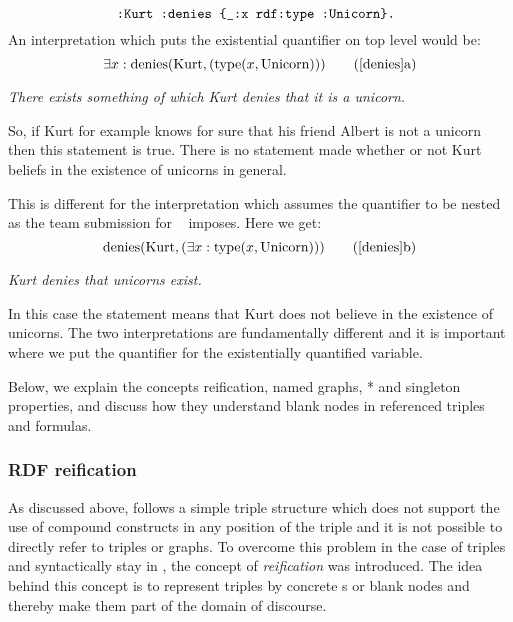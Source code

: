 % 
\begin{equation}\label{denies}
\verb!:Kurt :denies {_:x rdf:type :Unicorn}. !
\end{equation}
An interpretation which puts the existential quantifier on top level would be:
\[
\exists x : \text{denies}(\text{Kurt}, (\text{type}(x, \text{Unicorn})))\tag{\ref{denies}a} \label{dtop}
\]
\begin{center}\textit{
There exists something of which Kurt denies that it is a unicorn.
}
\end{center}
So, if Kurt for example knows for sure that his friend Albert is not a unicorn then this statement is true. There is no statement made whether or not Kurt beliefs 
in the existence of unicorns in general. 

This is different for the interpretation which assumes the quantifier to be nested as the \wwwc team submission for \nthree~\cite{Notation3} imposes. Here we get:
\[
 \text{denies}(\text{Kurt}, (\exists x : \text{type}(x, \text{Unicorn})))\tag{\ref{denies}b} \label{dnest}
\]
\begin{center}\textit{
Kurt denies that unicorns exist.
}
\end{center}
In this case the statement means that Kurt does not believe in the existence of unicorns. The two interpretations are fundamentally different and it is important where we put 
the quantifier for the existentially quantified variable.

Below, we explain the concepts \rdf reification, named graphs, \rdf{}* and singleton properties, and discuss how they understand blank nodes in referenced triples and formulas.






% 

\subsubsection{RDF reification}
As discussed above, \rdf follows a simple triple structure which does not support the use of compound constructs in any position of the triple and it is not possible 
to directly refer to triples or graphs. To overcome this problem in the case of triples and syntactically stay in \rdf, the concept of \emph{reification} was introduced. 
The idea behind this concept is to represent triples by concrete \iri{}s
or blank nodes
and thereby make them part of the domain of discourse. 

